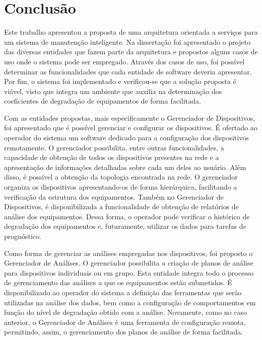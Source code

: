 \chapter{Conclusão}
\label{cha:conclusao}

Este trabalho apresentou a proposta de uma arquitetura orientada a serviços para um sistema de
manutenção inteligente. Na dissertação foi apresentado o projeto das diversas entidades que fazem
parte da arquitetura e propostos alguns casos de uso onde o sistema pode ser empregado. Através dos
casos de uso, foi possível determinar as funcionalidades que cada entidade de software deveria
apresentar. Por fim, o sistema foi implementado e verificou-se que a solução proposta é viável,
visto que integra um ambiente que auxilia na determinação dos coeficientes de degradação de
equipamentos de forma facilitada.


Com as entidades propostas, mais especificamente o Gerenciador de Dispositivos, foi apresentado que
é possível gerenciar e configurar os dispositivos. É ofertado ao operador do sistema um software
dedicado para a configuração dos dispositivos remotamente. O gerenciador possibilita, entre outras
funcionalidades, a capacidade de obtenção de todos os dispositivos presentes na rede e a
apresentação de informações detalhadas sobre cada um deles ao usuário. Além disso, é possível a
obtenção da topologia encontrada na rede. O gerenciador organiza os dispositivos apresentando-os de
forma hierárquica, facilitando a verificação da estrutura dos equipamentos. Também no Gerenciador de
Dispositivos, é disponibilizada a funcionalidade de obtenção de relatórios de análise dos
equipamentos. Dessa forma, o operador pode verificar o histórico de degradação dos equipamentos e,
futuramente, utilizar os dados para tarefas de prognóstico.

Como forma de gerenciar as análises empregadas nos dispositivos, foi proposto o Gerenciador de
Análises. O gerenciador possibilita a criação de planos de análise para dispositivos individuais ou
em grupo. Esta entidade integra todo o processo de gerenciamento das análises a que os equipamentos
estão submetidos. É disponibilizado ao operador do sistema a definição das ferramentas que serão
utilizadas na análise dos dados, bem como a configuração de comportamentos em função do nível de
degradação obtido com a análise. Novamente, como no caso anterior, o Gerenciador de Análises é uma
ferramenta de configuração remota, permitindo, assim, o gerenciamento dos planos de análise de forma
facilitada.

